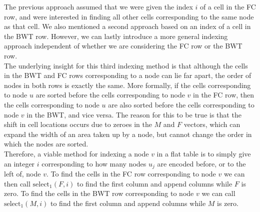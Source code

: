 \documentclass[a4paper,12pt,twoside,BCOR=10mm]{scrbook}
\begin{document}
The previous approach assumed that we were given the index $ i $ of a cell in the FC row,
and were interested in finding all other cells corresponding to the same node as that cell.
We also mentioned a second approach based on an index of a cell in the BWT row.
However, we can lastly introduce a more general indexing approach independent of whether we
are considering the FC row or the BWT row. \\
The underlying insight for this third indexing method is that although the cells in the BWT
and FC rows corresponding to a node can lie far apart, the order of nodes in both rows is exactly the same.
More formally, if the cells corresponding to node $ u $ are sorted before the cells corresponding to node $ v $ in
the FC row, then the cells corresponding to node $ u $ are also sorted before the cells corresponding to node $ v $ in
the BWT, and vice versa. The reason for this to be true is that the shift in cell locations occurs due to zeroes in
the $ M $ and $ F $ vectors, which can expand the width of an area taken up by a node, but cannot change the order
in which the nodes are sorted. \\
Therefore, a viable method for indexing a node $ v $ in a flat table
is to simply give an integer $ i $ corresponding to how many nodes $ u_j $ are encoded before, or to
the left of, node $ v $.
To find the cells in the FC row corresponding to node $ v $ we can then call $ \textrm{select}_1 ( F, i ) $ to
find the first column and append columns while $ F $ is zero.
To find the cells in the BWT row corresponding to node $ v $ we can call $ \textrm{select}_1 ( M, i ) $ to
find the first column and append columns while $ M $ is zero.
\end{document}
